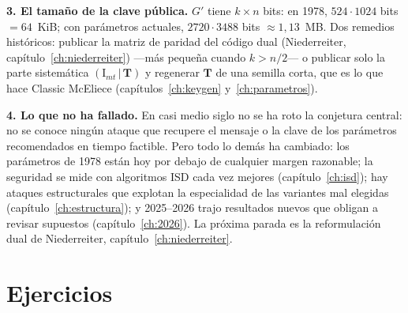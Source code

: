 \documentclass[11pt,a4paper,oneside]{report}
\newcommand{\Tmat}{\mathbf{T}}          %
\begin{document}
\smallskip
\noindent\textbf{3. El tamaño de la clave pública.} $G'$ tiene
$k\times n$ bits: en 1978, $524\cdot1024$ bits $=64$~KiB; con
parámetros actuales, $2720\cdot3488$ bits $\approx1{,}13$~MB. Dos
remedios históricos: publicar la matriz de paridad del código dual
(Niederreiter, capítulo~\ref{ch:niederreiter}) —más pequeña cuando
$k>n/2$— o publicar solo la parte sistemática
$(\mathrm{I}_{mt}\,|\,\Tmat)$ y regenerar $\Tmat$ de una semilla corta,
que es lo que hace Classic McEliece (capítulos~\ref{ch:keygen}
y~\ref{ch:parametros}).

\smallskip
\noindent\textbf{4. Lo que no ha fallado.} En casi medio siglo no se ha
roto la conjetura central: no se conoce ningún ataque que recupere el
mensaje o la clave de los parámetros recomendados en tiempo factible.
Pero todo lo demás ha cambiado: los parámetros de 1978 están hoy por
debajo de cualquier margen razonable; la seguridad se mide con
algoritmos ISD cada vez mejores (capítulo~\ref{ch:isd}); hay ataques
estructurales que explotan la especialidad de las variantes mal
elegidas (capítulo~\ref{ch:estructura}); y 2025--2026 trajo resultados
nuevos que obligan a revisar supuestos (capítulo~\ref{ch:2026}). La
próxima parada es la reformulación dual de Niederreiter,
capítulo~\ref{ch:niederreiter}.

\section{Ejercicios}
\end{document}
